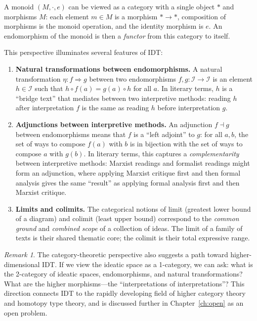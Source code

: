 \documentclass[11pt,openany]{book}
\theoremstyle{definition}
\theoremstyle{plain}
\theoremstyle{remark}
\newtheorem{remark}[axiom]{Remark}
\newcommand{\IS}{\mathcal{I}}               %
\newcommand{\compose}{\circ}                 %
\begin{document}
A monoid $(M, \cdot, e)$ can be viewed as a category with a single object $*$ and morphisms $M$: each element $m \in M$ is a morphism $* \to *$, composition of morphisms is the monoid operation, and the identity morphism is $e$. An endomorphism of the monoid is then a \emph{functor} from this category to itself.

This perspective illuminates several features of IDT:

\begin{enumerate}
\item \textbf{Natural transformations between endomorphisms.} A natural transformation $\eta : f \Rightarrow g$ between two endomorphisms $f, g : \IS \to \IS$ is an element $h \in \IS$ such that $h \compose f(a) = g(a) \compose h$ for all $a$. In literary terms, $h$ is a ``bridge text'' that mediates between two interpretive methods: reading $h$ after interpretation $f$ is the same as reading $h$ before interpretation $g$.

\item \textbf{Adjunctions between interpretive methods.} An adjunction $f \dashv g$ between endomorphisms means that $f$ is a ``left adjoint'' to $g$: for all $a, b$, the set of ways to compose $f(a)$ with $b$ is in bijection with the set of ways to compose $a$ with $g(b)$. In literary terms, this captures a \emph{complementarity} between interpretive methods: Marxist readings and formalist readings might form an adjunction, where applying Marxist critique first and then formal analysis gives the same ``result'' as applying formal analysis first and then Marxist critique.

\item \textbf{Limits and colimits.} The categorical notions of limit (greatest lower bound of a diagram) and colimit (least upper bound) correspond to the \emph{common ground} and \emph{combined scope} of a collection of ideas. The limit of a family of texts is their shared thematic core; the colimit is their total expressive range.
\end{enumerate}

\begin{remark}
The category-theoretic perspective also suggests a path toward higher-dimensional IDT. If we view the ideatic space as a 1-category, we can ask: what is the 2-category of ideatic spaces, endomorphisms, and natural transformations? What are the higher morphisms---the ``interpretations of interpretations''? This direction connects IDT to the rapidly developing field of higher category theory and homotopy type theory, and is discussed further in Chapter~\ref{ch:open} as an open problem.
\end{remark}
\end{document}

